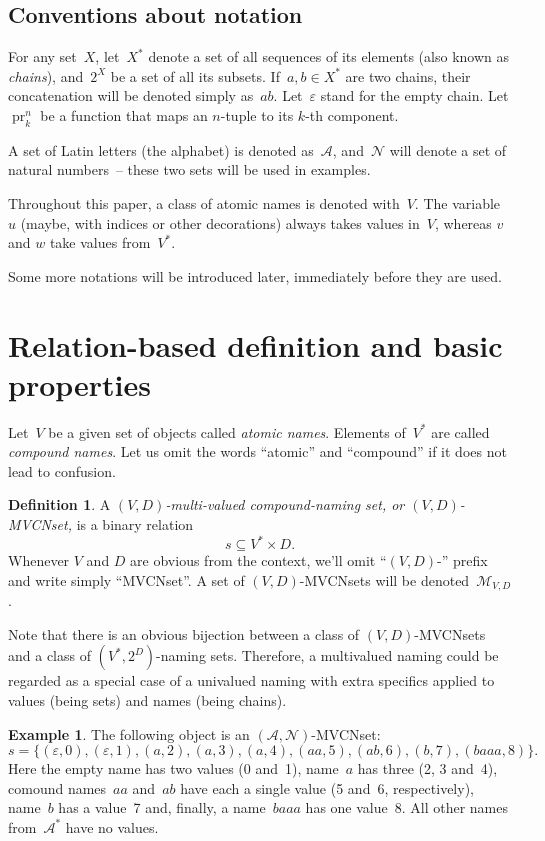 \documentclass{article}
\theoremstyle{definition}
\newtheorem{Df}{Definition}
\newtheorem{Ex}{Example}
\newcommand{\setcharmvcn}{M}
\newcommand{\setsymbol}[3]{\mathcal{#1}_{#2,#3}}
\newcommand{\setmvcn}[2]{\setsymbol{\setcharmvcn}{#1}{#2}}
\newcommand{\seta}{\mathcal{A}}
\newcommand{\setn}{\mathcal{N}}
\newcommand{\proj}[2]{\operatorname{pr}^{#1}_{#2}}
\begin{document}
\subsection*{Conventions about notation}

For any set~$X$, let~$X^\ast$ denote a set of all sequences of its elements
(also known as \emph{chains}), and~$2^X$ be a set of all its subsets.
If~$a,b\in X^\ast$ are two chains, their concatenation will be denoted simply
as~$ab$. Let~$\varepsilon$ stand for the empty chain.
Let $\proj{n}{k}$ be a function that maps an $n$-tuple to its $k$-th component.

A set of Latin letters (the alphabet) is denoted as~$\seta$,
and~$\setn$ will denote a set of natural numbers~-- these two sets will be
used in examples.

Throughout this paper, a class of atomic names is denoted with~$V$. The
variable~$u$ (maybe, with indices or other decorations) always takes values
in~$V$, whereas $v$ and $w$ take values from~$V^\ast$.

Some more notations will be introduced later, immediately before they are used.



\section{Relation-based definition and basic properties}

Let~$V$ be a given set of objects called \emph{atomic names}. Elements
of~$V^\ast$ are called \emph{compound names}. Let us omit the words ``atomic''
and ``compound'' if it does not lead to confusion.

\begin{Df}\label{df:mvcn}
A \emph{$(V,D)$-multi-valued compound-naming set, or $(V,D)$-MVCNset,} is a binary
relation
\[
  s \subseteq V^\ast \times D .
\]
Whenever $V$ and $D$ are obvious from the context, we'll omit ``$(V,D)$-''
prefix and write simply ``MVCNset''. A set of $(V,D)$-MVCNsets will be
denoted~$\setmvcn{V}{D}$.
\end{Df}

Note that there is an obvious bijection between a class of $(V,D)$-MVCNsets and
a class of $(V^\ast, 2^D)$-naming sets.
Therefore, a multivalued naming could be regarded as a special case of
a univalued naming with extra specifics applied to values (being sets) and names
(being chains).

\begin{Ex}\label{ex:mvcn}
The following object is an $(\seta, \setn)$-MVCNset:
\[
  s = \{
    (\varepsilon, 0),
    (\varepsilon, 1),
    (a,           2),
    (a,           3),
    (a,           4),
    (aa,          5),
    (ab,          6),
    (b,           7),
    (baaa,        8)
  \} .
\]
Here the empty name has two values (0 and~1), name~$a$ has three (2, 3 and~4),
comound names~$aa$ and~$ab$ have each a single value (5 and~6, respectively),
name~$b$ has a value~7 and, finally, a name~$baaa$ has one value~8. All other
names from~$\seta^\ast$ have no values.
\end{Ex}
\end{document}
